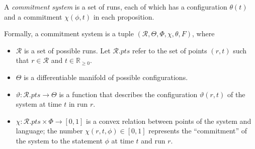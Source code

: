 \documentclass{article}
\newcommand\pts[1]{#1.\mathit{pts}}
\newcommand\R{\mathcal R}
\begin{document}
\begin{defn}
    A \emph{commitment system}
    is a set of runs, each of which has a configuration $\theta(t)$
    and a commitment $\chi(\phi, t)$ in each proposition.

    Formally, a commitment system is a tuple
    $(\R, \Theta, \Phi, \chi, \theta, F)$,
    where
    \begin{itemize}[]
        \item $\R$ is a set of possible runs.
        Let $\pts \R$ refer to the set of points $(r,t)$ such that $r \in \R$ and $t \in \mathbb R_{\ge 0}$.
        \item $\Theta$ is a differentiable manifold of possible configurations.
        \item $\vartheta : \pts \R \to \Theta$ is a function that                describes the configuration $\vartheta(r,t)$ of the system at time $t$ in run $r$.
        \item
        $\chi: \pts \R \times \Phi \to [0,1]$
        is a convex relation between points of the system and language;
        the number $\chi(r, t, \phi) \in [0,1]$ represents the ``commitment'' of the system to the statement $\phi$ at time $t$ and run $r$.


\end{itemize}
\end{defn}
\end{document}
